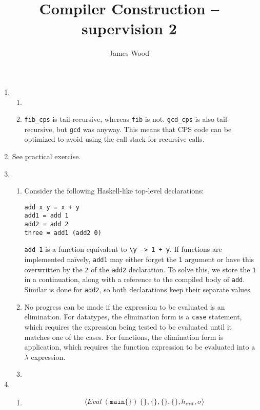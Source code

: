 \documentclass{article}
\begin{document}
\title{Compiler Construction -- supervision 2}
\author{James Wood}
\maketitle

\begin{enumerate}
  \item
    \begin{enumerate}
      \item 
      \item \texttt{fib\_cps} is tail-recursive, whereas \texttt{fib} is not. \texttt{gcd\_cps} is also tail-recursive, but \texttt{gcd} was anyway. This means that CPS code can be optimized to avoid using the call stack for recursive calls.
    \end{enumerate}
  \item See practical exercise.
  \item
    \begin{enumerate}
      \item Consider the following Haskell-like top-level declarations:
        \begin{lstlisting}
add x y = x + y
add1 = add 1
add2 = add 2
three = add1 (add2 0)
        \end{lstlisting}
        \texttt{add 1} is a function equivalent to \texttt{\textbackslash y -> 1 + y}. If functions are implemented na\"ively, \texttt{add1} may either forget the \texttt{1} argument or have this overwritten by the \texttt{2} of the \texttt{add2} declaration. To solve this, we store the \texttt{1} in a continuation, along with a reference to the compiled body of \texttt{add}. Similar is done for \texttt{add2}, so both declarations keep their separate values.
      \item No progress can be made if the expression to be evaluated is an elimination. For datatypes, the elimination form is a \texttt{case} statement, which requires the expression being tested to be evaluated until it matches one of the cases. For functions, the elimination form is application, which requires the function expression to be evaluated into a $\lambda$ expression.
      \item 
    \end{enumerate}
  \item
    \begin{enumerate}
      \item
        \begin{align*}
          & \langle \mathit{Eval}~(\mathtt{main \{\}})~\{\},\{\},\{\},\{\}, h_{\mathit{init}}, \sigma \rangle \\

\end{align*}
\end{enumerate}
\end{enumerate}
\end{document}
